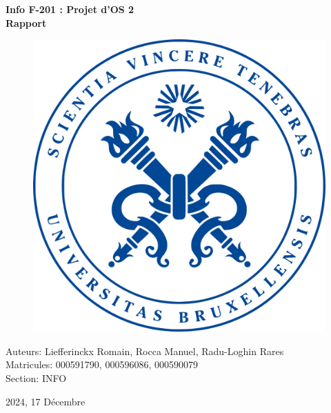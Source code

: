 \documentclass[utf8]{article}
\begin{document}
\begin{titlepage}
    \centering
    
    \vspace*{1cm}
    {\huge \bfseries Info F-201 : Projet d’OS 2\\
                    Rapport \par}
    
    \vfill
    
    \begin{figure}[h]
        \centering
        \includegraphics[scale=0.2]{logo.png}
    \end{figure}
    
    \vfill
    
    {\large Auteurs: Liefferinckx Romain, Rocca Manuel, Radu-Loghin Rares\\ 
            Matricules: 000591790, 000596086, 000590079 \\ 
            Section: INFO \par}
    {\large 2024, 17 Décembre \par}
\end{titlepage}
\end{document}
